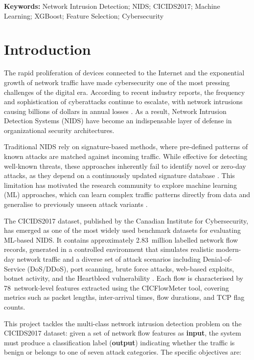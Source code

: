 \documentclass[12pt, a4paper]{article}
\begin{document}
\medskip
\noindent
\textbf{Keywords:} Network Intrusion Detection; NIDS; CICIDS2017; Machine Learning; XGBoost; Feature Selection; Cybersecurity

\newpage
\section{Introduction}

The rapid proliferation of devices connected to the Internet and the exponential growth of network traffic have made cybersecurity one of the most pressing challenges of the digital era.
According to recent industry reports, the frequency and sophistication of cyberattacks continue to escalate, with network intrusions causing billions of dollars in annual losses \cite{cybersecurityventures}.
As a result, Network Intrusion Detection Systems (NIDS) have become an indispensable layer of defense in organizational security architectures.

Traditional NIDS rely on signature-based methods, where pre-defined patterns of known attacks are matched against incoming traffic.
While effective for detecting well-known threats, these approaches inherently fail to identify novel or zero-day attacks, as they depend on a continuously updated signature database \cite{zeroday_ml_review}.
This limitation has motivated the research community to explore machine learning (ML) approaches, which can learn complex traffic patterns directly from data and generalise to previously unseen attack variants \cite{ml_ids_survey}.

The CICIDS2017 dataset, published by the Canadian Institute for Cybersecurity, has emerged as one of the most widely used benchmark datasets for evaluating ML-based NIDS.
It contains approximately 2.83~million labelled network flow records, generated in a controlled environment that simulates realistic modern-day network traffic and a diverse set of attack scenarios including Denial-of-Service (DoS/DDoS), port scanning, brute force attacks, web-based exploits, botnet activity, and the Heartbleed vulnerability \cite{cicids2017}.
Each flow is characterised by 78~network-level features extracted using the CICFlowMeter tool, covering metrics such as packet lengths, inter-arrival times, flow durations, and TCP flag counts.

This project tackles the multi-class network intrusion detection problem on the CICIDS2017 dataset:
given a set of network flow features as \textbf{input}, the system must produce a classification label (\textbf{output}) indicating whether the traffic is benign or belongs to one of seven attack categories.
The specific objectives are:
\end{document}
